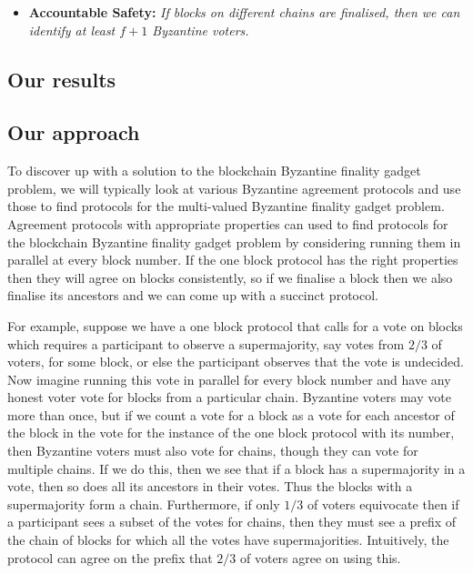 \documentclass{article}
\begin{document}
\begin{itemize}
	\item{\bf Accountable Safety:} {\em If blocks on different chains are finalised, then we can identify at least $f+1$ Byzantine voters.}
\end{itemize}

\subsection{Our results}

\subsection{Our approach}

To discover up with a solution to the blockchain Byzantine finality gadget problem, we will typically look at various Byzantine agreement protocols and use those to find protocols for the multi-valued Byzantine finality gadget problem. 
Agreement protocols with appropriate properties can used to find protocols for the blockchain Byzantine finality gadget problem by considering running them in parallel at every block number.
If the one block protocol has the right properties then they will agree on blocks consistently, so if we finalise a block then we also finalise its ancestors and we can come up with a succinct protocol.

For example, suppose we have a one block protocol that calls for a vote on blocks which requires a participant to observe a supermajority, say votes from  $2/3$ of voters, for some block, or else the participant observes that the vote is undecided. Now imagine running this vote in parallel for every block number and have any honest voter vote for blocks from a particular chain.
Byzantine voters may vote more than once, but if we count a vote for a block as a vote for each ancestor of the block in the vote for the instance of the one block protocol with its number, then Byzantine voters must also vote for chains, though they can vote for multiple chains.
If we do this, then we see that if a block has a supermajority in a vote, then so does all its ancestors in their votes. Thus the blocks with a supermajority form a chain.
Furthermore, if only $1/3$ of voters equivocate then if a participant sees a subset of the votes for chains, then they must see a prefix of the chain of blocks for which all the votes have supermajorities. Intuitively, the protocol can agree on the prefix that $2/3$ of voters agree on using this. 
\end{document}
